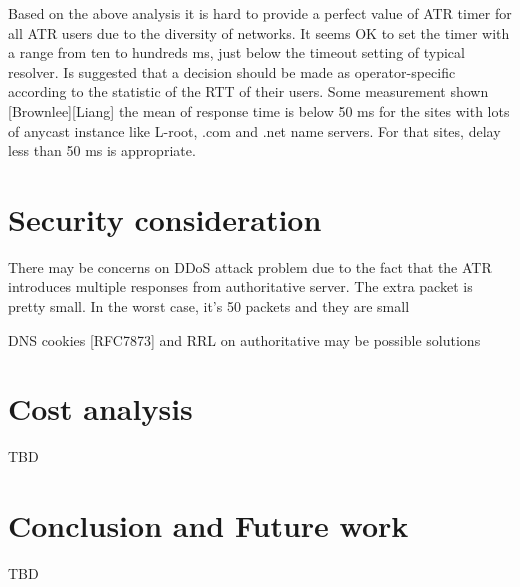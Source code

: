 Based on the above analysis it is hard to provide a perfect value of
ATR timer for all ATR users due to the diversity of networks.  It
seems OK to set the timer with a range from ten to hundreds ms, just
below the timeout setting of typical resolver.  Is suggested that a
decision should be made as operator-specific according to the
statistic of the RTT of their users.  Some measurement shown
[Brownlee][Liang] the mean of response time is below 50 ms for the
sites with lots of anycast instance like L-root, .com and .net name
servers.  For that sites, delay less than 50 ms is appropriate.


\section{Security consideration}


There may be concerns on DDoS attack problem due to the fact that the
ATR introduces multiple responses from authoritative server.  The
extra packet is pretty small.  In the worst case, it's 50%
packets and they are small

DNS cookies [RFC7873] and RRL on authoritative may be possible
solutions


\section{Cost analysis}
TBD
\section{Conclusion and Future work}
TBD